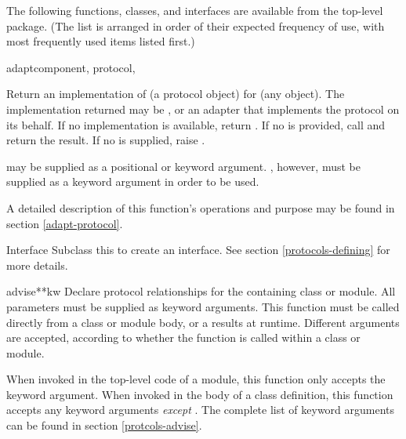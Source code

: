 \begin{verbatim%
}
\begin{verbatim%
}
\begin{verbatim%
}
\begin{verbatim%
}
The following functions, classes, and interfaces are available from the
top-level  package.  (The list is arranged in order of
their expected frequency of use, with most frequently used items listed first.)

\begin{funcdesc}{adapt}{component, protocol,
}

Return an implementation of  (a protocol object) for
 (any object).  The implementation returned may be
, or an adapter that implements the protocol on its
behalf.  If no implementation is available, return .  If no
 is provided, call  and return the result.  If no  is supplied,
raise .

 may be supplied as a positional or keyword argument.
, however, must be supplied as a keyword argument in order
to be used.

A detailed description of this function's operations and purpose may be found in
section \ref{adapt-protocol}.
\end{funcdesc}

\begin{classdesc*}{Interface}
Subclass this to create an interface.  See section \ref{protocols-defining}
for more details.
\end{classdesc*}












\begin{funcdesc}{advise}{**kw}
Declare protocol relationships for the containing class or module.  All
parameters must be supplied as keyword arguments.  This function must be
called directly from a class or module body, or a 
results at runtime.  Different arguments are accepted, according to whether
the function is called within a class or module.

When invoked in the top-level code of a module, this function only accepts
the  keyword argument.  When invoked in the body of a
class definition, this function accepts any keyword arguments \emph{except}
.  The complete list of keyword arguments can be found
in section \ref{protcols-advise}.


\end{funcdesc}
\end{verbatim%
}
\end{verbatim%
}
\end{verbatim%
}
\end{verbatim%
}

